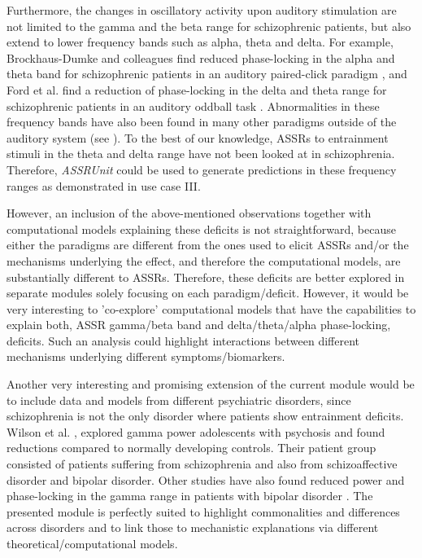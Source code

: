 \documentclass[a4paper,10pt]{article}
\begin{document}
Furthermore, the changes in oscillatory activity upon auditory stimulation are not limited to the gamma and the beta range for schizophrenic patients, but also extend to lower frequency bands such as alpha, theta and delta.
For example, Brockhaus-Dumke and colleagues find reduced phase-locking in the alpha and theta band for schizophrenic patients in an auditory paired-click paradigm \cite{Brockhaus2008}, and Ford et al. find a
reduction of phase-locking in the delta and theta range for schizophrenic patients in an auditory oddball task \cite{Ford2008}. Abnormalities in these frequency bands have also been found in many other paradigms outside of
the auditory system (see \cite{Basar2013}). To the best of our knowledge, ASSRs to entrainment stimuli in the theta and delta range have not been looked at in schizophrenia. Therefore, \textit{ASSRUnit} could be 
used to generate predictions in these frequency ranges as demonstrated in use case III.

However, an inclusion of the above-mentioned observations together with computational models explaining these deficits is not straightforward, because either the paradigms are different from the ones
used to elicit ASSRs and/or the mechanisms underlying the effect, and therefore the computational models, are substantially different to ASSRs. Therefore, these deficits are better explored in separate modules solely focusing
on each paradigm/deficit. However, it would be very interesting to 'co-explore' computational models that have the capabilities to explain both, ASSR gamma/beta band and delta/theta/alpha phase-locking, deficits. Such an analysis 
could highlight interactions between different mechanisms underlying different symptoms/biomarkers.

Another very interesting and promising extension of the current module would be to include data and models from different psychiatric disorders, since schizophrenia is not the only disorder
where patients show entrainment deficits. Wilson et al. \cite{Wilson2007}, explored gamma power adolescents with psychosis and found reductions compared to normally developing controls. Their patient group
consisted of patients suffering from schizophrenia and also from schizoaffective disorder and bipolar disorder. Other studies have also found reduced power and phase-locking in the gamma range in patients 
with bipolar disorder \cite{ODonnell2004,Spencer2008,Rass2010}.
The presented module is perfectly suited to highlight commonalities and differences across disorders and to link those to mechanistic 
explanations via different theoretical/computational models.
\end{document}
